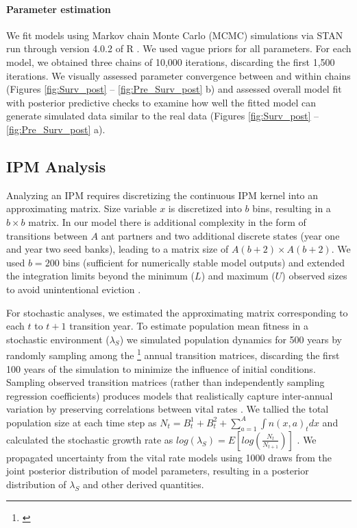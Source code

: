 \documentclass[11pt]{article}
\newcommand{\tom}[2]{{\color{red}{#1}}\footnote{\textit{\color{red}{#2}}}}
\begin{document}
\paragraph{Parameter estimation}
We fit models using Markov chain Monte Carlo (MCMC) simulations via STAN run through version 4.0.2 of R \cite{Rcite,Rstancite}. 
We used vague priors for all parameters. 
For each model, we obtained three chains of 10,000 iterations, discarding the first 1,500 iterations. 
We visually assessed parameter convergence between and within chains (Figures \ref{fig:Surv_post} -- \ref{fig:Pre_Surv_post} b) and assessed overall model fit with posterior predictive checks to examine how well the fitted model can generate simulated data similar to the real data (Figures \ref{fig:Surv_post} -- \ref{fig:Pre_Surv_post} a).

\subsection*{IPM Analysis}
Analyzing an IPM requires discretizing the continuous IPM kernel into an approximating matrix. 
Size variable $x$ is discretized into $b$ bins, resulting in a $b \times b$ matrix.
In our model there is additional complexity in the form of transitions between $A$ ant partners and two additional discrete states (year one and year two seed banks), leading to a matrix size of $A(b+2) \times A(b+2)$.
We used $b = 200$ bins (sufficient for numerically stable model outputs) and extended the integration limits beyond the minimum ($L$) and maximum ($U$) observed sizes to avoid unintentional eviction \cite{Williams2012}. 

For stochastic analyses, we estimated the approximating matrix corresponding to each $t$ to $t+1$ transition year. 
To estimate population mean fitness in a stochastic environment ($\lambda_{S}$) we simulated population dynamics for 500 years by randomly sampling among the \tom{19}{Is this right? The number of transition matrices should be one fewer than then number of years, but I don't remember what happens with 2020.} annual transition matrices, discarding the first 100 years of the simulation to minimize the influence of initial conditions. 
Sampling observed transition matrices (rather than independently sampling regression coefficients) produces models that realistically capture inter-annual variation by preserving correlations between vital rates \cite{metcalf2015statistical}.
We tallied the total population size at each time step as  $N_{t} = B^1_{t} + B^2_{t} + \sum_{a=1}^{A}\int n(x,a)_{t}dx$ and calculated the stochastic growth rate as $log(\lambda_S) = E[log(\frac{N_{t}}{N_{t+1}})]$ \cite{rees2009integral}.
We propagated uncertainty from the vital rate models using 1000 draws from the joint posterior distribution of model parameters, resulting in a posterior distribution of $\lambda_{S}$ and other derived quantities.
\end{document}
